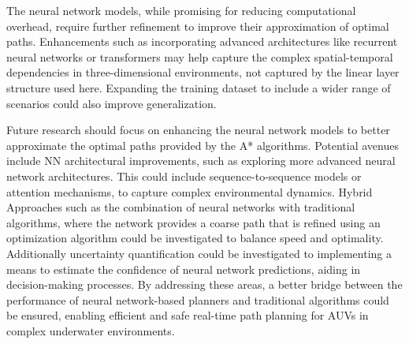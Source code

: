 \documentclass[final,5p,times,twocolumn]{elsarticle}
\begin{document}
The neural network models, while promising for reducing computational overhead, require further refinement to improve their approximation of optimal paths. Enhancements such as incorporating advanced architectures like recurrent neural networks or transformers may help capture the complex spatial-temporal dependencies in three-dimensional environments, not captured by the linear layer structure used here. Expanding the training dataset to include a wider range of scenarios could also improve generalization.

Future research should focus on enhancing the neural network models to better approximate the optimal paths provided by the A* algorithms. Potential avenues include NN architectural improvements, such as exploring more advanced neural network architectures. This could include sequence-to-sequence models or attention mechanisms, to capture complex environmental dynamics. Hybrid Approaches such as the combination of neural networks with traditional algorithms, where the network provides a coarse path that is refined using an optimization algorithm could be investigated to balance speed and optimality. Additionally uncertainty quantification could be investigated to implementing a means to estimate the confidence of neural network predictions, aiding in decision-making processes. By addressing these areas, a better bridge between the performance of neural network-based planners and traditional algorithms could be ensured, enabling efficient and safe real-time path planning for AUVs in complex underwater environments.


 


\end{document}
